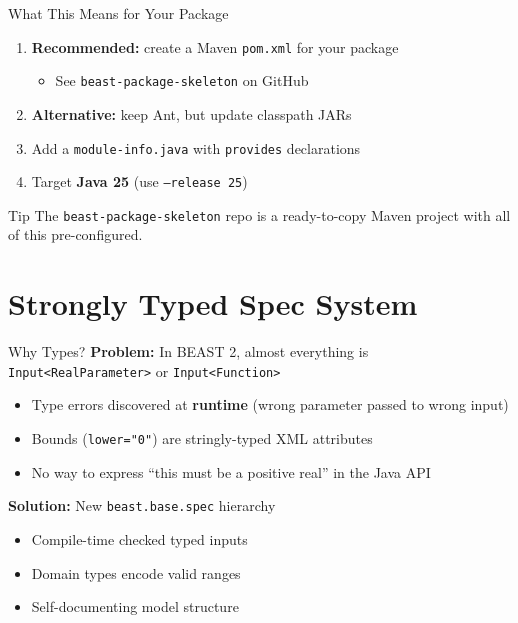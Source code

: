 \documentclass[aspectratio=169,11pt]{beamer}
\newcommand{\pkg}[1]{\texttt{\color{beastorange}#1}}
\newcommand{\code}[1]{\texttt{#1}}
\begin{document}
\begin{frame}{What This Means for Your Package}
\begin{enumerate}
\item \textbf{Recommended:} create a Maven \code{pom.xml} for your package
  \begin{itemize}
  \item See \pkg{beast-package-skeleton} on GitHub
  \end{itemize}
\item \textbf{Alternative:} keep Ant, but update classpath JARs
\item Add a \code{module-info.java} with \code{provides} declarations
\item Target \textbf{Java 25} (use \code{--release 25})
\end{enumerate}
\vspace{1em}
\begin{alertblock}{Tip}
The \pkg{beast-package-skeleton} repo is a ready-to-copy Maven project with all of this pre-configured.
\end{alertblock}
\end{frame}

\section{Strongly Typed Spec System}

\begin{frame}{Why Types?}
\textbf{Problem:} In BEAST 2, almost everything is \code{Input<RealParameter>} or \code{Input<Function>}
\begin{itemize}
\item Type errors discovered at \textbf{runtime} (wrong parameter passed to wrong input)
\item Bounds (\code{lower="0"}) are stringly-typed XML attributes
\item No way to express ``this must be a positive real'' in the Java API
\end{itemize}
\vspace{1em}
\textbf{Solution:} New \code{beast.base.spec} hierarchy
\begin{itemize}
\item Compile-time checked typed inputs
\item Domain types encode valid ranges
\item Self-documenting model structure
\end{itemize}
\end{frame}
\end{document}
